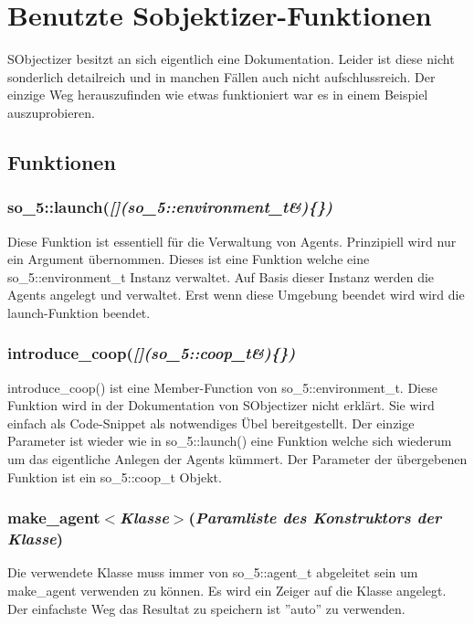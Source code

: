 \chapter{Benutzte Sobjektizer-Funktionen}

\vspace{10mm}

SObjectizer besitzt an sich eigentlich eine Dokumentation. Leider ist diese
nicht sonderlich detailreich und in manchen Fällen auch nicht aufschlussreich.
Der einzige Weg herauszufinden wie etwas funktioniert war es in einem Beispiel auszuprobieren.

\section{Funktionen}

\subsection{so\_5::launch(\textit{[](so\_5::environment\_t\&)\{\})}}
Diese Funktion ist essentiell für die Verwaltung von Agents. Prinzipiell wird nur ein Argument übernommen.
Dieses ist eine Funktion welche eine so\_5::environment\_t Instanz verwaltet. Auf Basis dieser Instanz werden
die Agents angelegt und verwaltet. Erst wenn diese Umgebung beendet wird wird die launch-Funktion beendet.

\subsection{introduce\_coop(\textit{[](so\_5::coop\_t\&)\{\})}}
introduce\_coop() ist eine Member-Function von so\_5::environment\_t. Diese Funktion wird in der Dokumentation von
SObjectizer nicht erklärt. Sie wird einfach als Code-Snippet als notwendiges Übel bereitgestellt. Der einzige
Parameter ist wieder wie in so\_5::launch() eine Funktion welche sich wiederum um das eigentliche Anlegen der
Agents kümmert. Der Parameter der übergebenen Funktion ist ein so\_5::coop\_t Objekt.

\subsection{make\_agent$<$\textit{Klasse}$>$(\textit{Paramliste des Konstruktors der Klasse})}
Die verwendete Klasse muss immer von so\_5::agent\_t abgeleitet sein um make\_agent verwenden zu können.
Es wird ein Zeiger auf die Klasse angelegt. Der einfachste Weg das Resultat zu speichern ist ''auto'' zu
verwenden.


